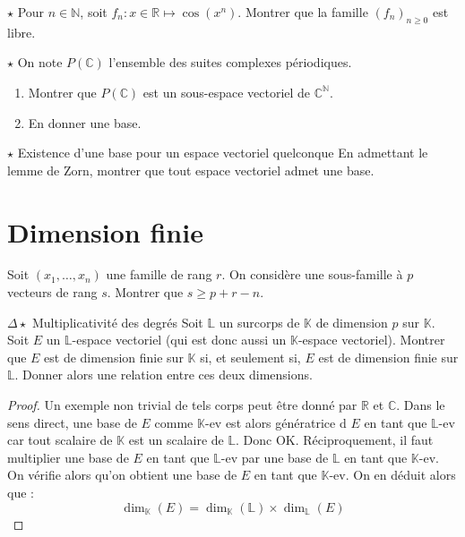 \documentclass[french,a4paper]{article}
\newcommand{\N}{\mathbb{N}}
\newcommand{\R}{\mathbb{R}}
\newcommand{\C}{\mathbb{C}}
\newcommand{\K}{\mathbb{K}}
\renewcommand{\L}{\mathbb{L}}
\theoremstyle{plain}
\theoremstyle{definition}
\theoremstyle{remark}
\begin{document}
\begin{ex}[Moulin.EV.18]{$\star$}
	Pour $n\in\N$, soit $f_n:x\in\R\mapsto\cos(x^n)$. Montrer que la famille $(f_n)_{n\geqslant 0}$ est libre.
\end{ex}

\begin{ex}[Moulin.EV.19]{$\star$}
	On note $P(\C)$ l'ensemble des suites complexes périodiques.
	\begin{enumerate}
		\item Montrer que $P(\C)$ est un sous-espace vectoriel de $\C^\N$.
		\item En donner une base.
	\end{enumerate}
\end{ex}

\begin{ex}{$\star$ Existence d'une base pour un espace vectoriel quelconque}
	En admettant le lemme de Zorn, montrer que tout espace vectoriel admet une base.
\end{ex}

\section{Dimension finie}

\begin{ex}[Moulin.EV.20]{}
	Soit $(x_1,\ldots,x_n)$ une famille de rang $r$. On considère une sous-famille à $p$ vecteurs de rang $s$. Montrer que $s\geqslant p+r-n$.
\end{ex}

\begin{ex}[Moulin.EV.21]{$\Delta\star$ Multiplicativité des degrés}
	Soit $\L$ un surcorps de $\K$ de dimension $p$ sur $\K$. Soit $E$ un $\L$-espace vectoriel (qui est donc aussi un $\K$-espace vectoriel). Montrer que $E$ est de dimension finie sur $\K$ si, et seulement si, $E$ est de dimension finie sur $\L$. Donner alors une relation entre ces deux dimensions.
\end{ex}
\begin{proof}
	Un exemple non trivial de tels corps peut être donné par $\R$ et $\C$. Dans le sens direct, une base de $E$ comme $\K$-ev est alors génératrice d $E$ en tant que $\L$-ev car tout scalaire de $\K$ est un scalaire de $\L$. Donc OK. Réciproquement, il faut multiplier une base de $E$ en tant que $\L$-ev par une base de $\L$ en tant que $\K$-ev. On vérifie alors qu'on obtient une base de $E$ en tant que $\K$-ev. On en déduit alors que : $$\dim_\K(E)=\dim_\K(\L)\times\dim_\L(E)$$
\end{proof}
\end{document}
